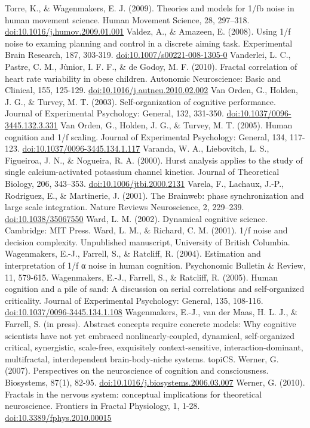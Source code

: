 \documentclass[12pt,]{book}
\begin{document}
Torre, K., \& Wagenmakers, E. J. (2009). Theories and models for 1/fb noise in human movement science. Human Movement Science, 28, 297--318. \url{doi:10.1016/j.humov.2009.01.001}
Valdez, A., \& Amazeen, E. (2008). Using 1/f noise to examing planning and control in a discrete aiming task. Experimental Brain Research, 187, 303-319. \url{doi:10.1007/s00221-008-1305-0}
Vanderlei, L. C., Pastre, C. M., Jùnior, I. F. F., \& de Godoy, M. F. (2010). Fractal correlation of heart rate variability in obese children. Autonomic Neuroscience: Basic and Clinical, 155, 125-129. \url{doi:10.1016/j.autneu.2010.02.002}
Van Orden, G., Holden, J. G., \& Turvey, M. T. (2003). Self-organization of cognitive performance. Journal of Experimental Psychology: General, 132, 331-350. \url{doi:10.1037/0096-3445.132.3.331}
Van Orden, G., Holden, J. G., \& Turvey, M. T. (2005). Human cognition and 1/f scaling. Journal of Experimental Psychology: General, 134, 117-123. \url{doi:10.1037/0096-3445.134.1.117}
Varanda, W. A., Liebovitch, L. S., Figueiroa, J. N., \& Nogueira, R. A. (2000). Hurst analysis applies to the study of single calcium-activated potassium channel kinetics. Journal of Theoretical Biology, 206, 343--353. \url{doi:10.1006/jtbi.2000.2131}
Varela, F., Lachaux, J.-P., Rodriguez, E., \& Martinerie, J. (2001). The Brainweb: phase synchronization and large scale integration. Nature Reviews Neuroscience, 2, 229--239. \url{doi:10.1038/35067550}
Ward, L. M. (2002). Dynamical cognitive science. Cambridge: MIT Press.
Ward, L. M., \& Richard, C. M. (2001). 1/f noise and decision complexity. Unpublished manuscript, University of British Columbia.
Wagenmakers, E.-J., Farrell, S., \& Ratcliff, R. (2004). Estimation and interpretation of 1/f α noise in human cognition. Psychonomic Bulletin \& Review, 11, 579-615.
Wagenmakers, E.-J., Farrell, S., \& Ratcliff, R. (2005). Human cognition and a pile of sand: A discussion on serial correlations and self-organized criticality. Journal of Experimental Psychology: General, 135, 108-116. \url{doi:10.1037/0096-3445.134.1.108}
Wagenmakers, E.-J., van der Maas, H. L. J., \& Farrell, S. (in press). Abstract concepts require concrete models: Why cognitive scientists have not yet embraced nonlinearly-coupled, dynamical, self-organized critical, synergistic, scale-free, exquisitely context-sensitive, interaction-dominant, multifractal, interdependent brain-body-niche systems. topiCS.
Werner, G. (2007). Perspectives on the neuroscience of cognition and consciousness. Biosystems, 87(1), 82-95. \url{doi:10.1016/j.biosystems.2006.03.007}
Werner, G. (2010). Fractals in the nervous system: conceptual implications for theoretical neuroscience. Frontiers in Fractal Physiology, 1, 1-28. \url{doi:10.3389/fphys.2010.00015}
\end{document}
